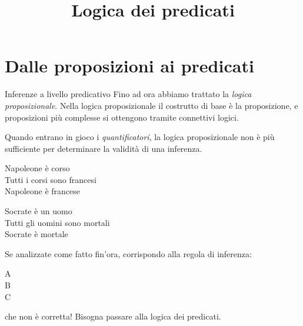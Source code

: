 \documentclass[10pt,dvipsnames,xcolor=table,handout]{beamer}
\title{Logica dei predicati}
\date{}
\begin{document}
\begin{frame}
    \titlepage
\end{frame}

\section{Dalle proposizioni ai predicati}

\begin{frame}{Inferenze a livello predicativo}
    Fino ad ora abbiamo trattato la \emph{logica proposizionale}. Nella logica proposizionale il costrutto di base è la proposizione, e proposizioni più complesse si ottengono tramite connettivi logici.

    \medskip
    Quando entrano in gioco i \emph{quantificatori}, la logica proposizionale non è più sufficiente per determinare la validità di una inferenza.

    \begin{center}
        \begin{inference}
            Napoleone è corso\\
            Tutti i corsi sono francesi\\
            \hline
            Napoleone è francese
        \end{inference}
        \qquad
        \begin{inference}
            Socrate è un uomo\\
            Tutti gli uomini sono mortali\\
            \hline
            Socrate è mortale
        \end{inference}
    \end{center}
    Se analizzate come fatto fin'ora, corrispondo alla regola di inferenza:
    \begin{center}
        \begin{inference}
            A\\
            B\\
            \hline
            C
        \end{inference}
    \end{center}
    che non è corretta! Bisogna passare alla \alert{logica dei predicati}.
\end{frame}
\end{document}
